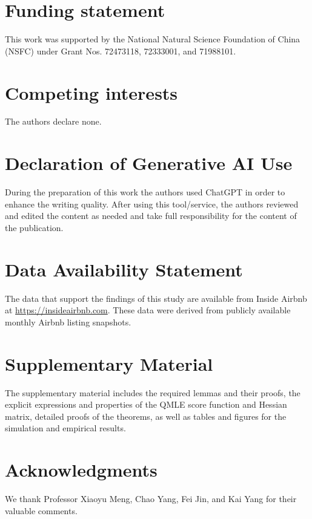 \documentclass[11pt,a4paper]{article}
\begin{document}



\section*{Funding statement}
This work was supported by the National Natural Science Foundation of China (NSFC) under Grant Nos. 72473118, 72333001, and 71988101.

\section*{Competing interests}
The authors declare none.

\section*{Declaration of Generative AI Use}
During the preparation of this work the authors used ChatGPT in order to enhance the writing quality. After using this tool/service, the authors reviewed and edited the content as needed and take full responsibility for the content of the publication.

\section*{Data Availability Statement}
The data that support the findings of this study are available from Inside Airbnb at \url{https://insideairbnb.com}. These data were derived from publicly available monthly Airbnb listing snapshots.

\label{supplementary-material}
\section*{Supplementary Material}
The supplementary material includes the required lemmas and their proofs, the explicit expressions and properties of the QMLE score function and Hessian matrix, detailed proofs of the theorems, as well as tables and figures for the simulation and empirical results.

\section*{Acknowledgments}
We thank Professor Xiaoyu Meng, Chao Yang, Fei Jin, and Kai Yang for their valuable comments.


\end{document}
